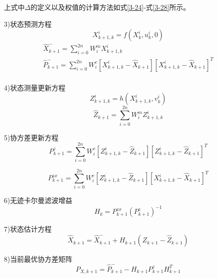 上式中$\Delta $的定义以及权值的计算方法如式\ref{3-24}-式\ref{3-28}所示。

3)状态预测方程
\begin{equation}
X_{k+1,k}^{i}=f\left( X_{k}^{i},u_{k}^{i},0 \right)
\end{equation} 
\begin{equation}
\begin{array}{l}
   \widehat{X}_{k+1}^{-}=\sum\limits_{i=0}^{2n}{W_{i}^{m}X_{k+1,k}^{i}} \\ 
  \widehat{P}_{k+1}^{-}=\sum\limits_{i=0}^{2n}{W_{i}^{c}\left[ X_{k+1,k}^{i}-{{\widehat{X}}_{k+1}} \right]}{{\left[ X_{k+1,k}^{i}-{{\widehat{X}}_{k+1}} \right]}^{T}} \\ 
\end{array}
\end{equation} 

4)状态测量更新方程
\begin{equation}
Z_{k+1,k}^{i}=h\left( X_{k+1,k}^{i},v_{k}^{i} \right)
\end{equation} 
\begin{equation}
{\widehat Z_{k + 1}} = \sum\limits_{i = 0}^{2n} {W_i^mZ_{k + 1,k}^i}
\end{equation} 

5)协方差更新方程
\begin{equation}
P_{k + 1}^z = \sum\limits_{i = 0}^{2n} {W_i^c\left[ {Z_{k + 1,k}^i - {{\widehat Z}_{k + 1}}} \right]} {\left[ {Z_{k + 1,k}^i - {{\widehat Z}_{k + 1}}} \right]^T}
\end{equation} 

\begin{equation}
P_{k + 1}^{zx} = \sum\limits_{i = 0}^{2n} {W_i^c\left[ {Z_{k + 1,k}^i - {{\widehat Z}_{k + 1}}} \right]} {\left[ {X_{k + 1,k}^i - {{\widehat X}_{k + 1}}} \right]^T}
\end{equation} 

6)无迹卡尔曼滤波增益
\begin{equation}
{H_k} = P_{k + 1}^{zx}{\left( {P_{k + 1}^z} \right)^{ - 1}}
\end{equation} 

7)状态估计方程
\begin{equation}
{\widehat X_{k + 1}} = \widehat X_{k + 1}^ -  + {H_{k + 1}}({Z_{k + 1}} - {\widehat Z_{k + 1}})
\end{equation} 

8)当前最优协方差矩阵
\begin{equation}
{P_{X,k + 1}} = \widehat P_{k + 1}^ -  - {H_{k + 1}}P_{k + 1}^zH_{k + 1}^T
\end{equation} 

